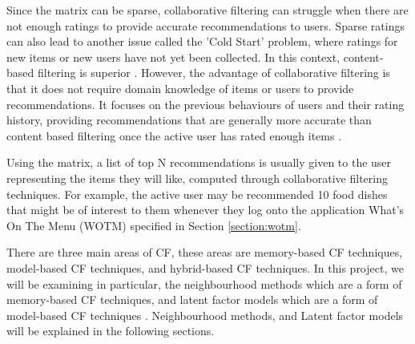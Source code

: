 Since the matrix can be sparse, collaborative filtering can struggle when there are not enough ratings to provide accurate recommendations to users. Sparse ratings can also lead to another issue called the 'Cold Start' problem, where ratings for new items or new users have not yet been collected. In this context, content-based filtering is superior \cite{koren2009matrix}. However, the advantage of collaborative filtering is that it does not require domain knowledge of items or users to provide recommendations. It focuses on the previous behaviours of users and their rating history, providing recommendations that are generally more accurate than content based filtering once the active user has rated enough items \cite{koren2009matrix, schafer2007collaborative}. 

Using the matrix, a list of top N recommendations is usually given to the user representing the items they will like, computed through collaborative filtering techniques. For example, the active user may be recommended 10 food dishes that might be of interest to them whenever they log onto the application What's On The Menu (WOTM) specified in Section \ref{section:wotm}.  

There are three main areas of CF, these areas are memory-based CF techniques, model-based CF techniques, and hybrid-based CF techniques. In this project, we will be examining in particular, the neighbourhood methods which are a form of memory-based CF techniques, and latent factor models which are a form of model-based CF techniques \cite{survey, koren2009matrix}. Neighbourhood methods, and Latent factor models will be explained in the following sections. 


